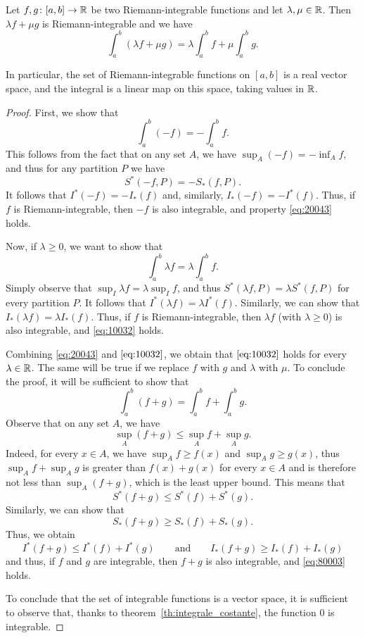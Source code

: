 \begin{theorem}
\mymark{*}
\label{th:integrale_lineare}
Let $f,g\colon [a,b]\to {\mathbb R}$ be two Riemann-integrable functions
and let $\lambda, \mu \in {\mathbb R}$. Then $\lambda f + \mu g$
is Riemann-integrable and we have
\[
  \int_a^b (\lambda f + \mu g) = \lambda \int_a^b f + \mu \int_a^b g.
\]

In particular, the set of Riemann-integrable functions on $[a,b]$ is
a real vector space, and the integral is a
linear map on this space, taking values in ${\mathbb R}$.
\end{theorem}
%
\begin{proof}
\mymark{*}
First, we show that
\begin{equation}\label{eq:20043}
  \int_a^b (-f) = -\int_a^b f.
\end{equation}
This follows from the fact that on any set $A$, we have
$\sup_A (-f) = -\inf_A f$, and thus for any partition $P$
we have
\[
  S^*(-f,P) = -S_*(f,P).
\]
It follows that $I^*(-f) = -I_*(f)$ and, similarly, $I_*(-f) = -I^*(f)$.
Thus, if $f$ is Riemann-integrable, then $-f$ is also integrable, and property
\eqref{eq:20043} holds.

Now, if $\lambda \ge 0$, we want to show that
\begin{equation}\label{eq:10032}
  \int_a^b \lambda f = \lambda \int_a^b f.
\end{equation}
Simply observe that $\sup_I \lambda f = \lambda \sup_I f$, and thus
$S^*(\lambda f,P) = \lambda S^*(f,P)$ for every partition $P$.
It follows that $I^*(\lambda f) = \lambda I^*(f)$. Similarly, we can
show that $I_*(\lambda f) = \lambda I_*(f)$. Thus, if $f$ is
Riemann-integrable, then $\lambda f$ (with $\lambda \ge 0$) is also integrable,
and \eqref{eq:10032} holds.

Combining \eqref{eq:20043} and $\eqref{eq:10032}$, we obtain
that $\eqref{eq:10032}$ holds for every $\lambda \in {\mathbb R}$.
The same will be true if we replace $f$ with $g$ and $\lambda$ with $\mu$.
To conclude the proof, it will be sufficient
to show that
\begin{equation}\label{eq:80003}
\int_a^b (f+g) = \int_a^b f + \int_a^b g.
\end{equation}
Observe that on any set $A$, we have
\[
  \sup_A (f+g) \le \sup_A f + \sup_A g.
\]
Indeed, for every $x\in A$, we have $\sup_A f\ge f(x)$ 
and $\sup_A g \ge g(x)$, thus $\sup_A f + \sup_A g$
is greater than $f(x)+g(x)$ for every $x\in A$ 
and is therefore not less than $\sup_A (f+g)$, which 
is the least upper bound.
This means that
\[
  S^*(f+g) \le S^*(f) + S^*(g).
\]
Similarly, we can show that
\[
  S_*(f+g) \ge S_*(f) + S_*(g).
\]
Thus, we obtain
\[
  I^*(f+g) \le I^*(f) + I^*(g)
  \qquad\text{and}\qquad
  I_*(f+g) \ge I_*(f) + I_*(g)
\]
and thus, if $f$ and $g$ are integrable, then $f+g$ is also integrable,
and \eqref{eq:80003} holds.

To conclude that the set of integrable functions is a vector space,
it is sufficient to observe that, thanks to theorem~\ref{th:integrale_costante},
the function $0$ is integrable.
\end{proof}

